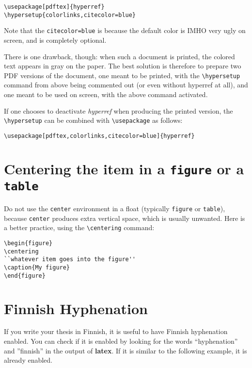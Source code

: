 \documentclass[a4paper,12pt]{article}
\newcommand{\cmd}[1]{\texttt{\textbackslash#1}}
\newcommand{\env}[1]{\texttt{#1}}
\newcommand{\pack}[1]{\textit{#1}}
\newcommand{\prog}[1]{\textbf{\textsf{#1}}}
\begin{document}
\begin{verbatim}
\usepackage[pdftex]{hyperref}
\hypersetup{colorlinks,citecolor=blue}
\end{verbatim}

Note that the \verb"citecolor=blue" is because the default color is IMHO very
ugly on screen, and is completely optional.

There is one drawback, though: when such a document is printed, the colored
text appears in gray on the paper. The best solution is therefore to prepare
two PDF versions of the document, one meant to be printed, with the
\cmd{hypersetup} command from above being commented out (or even without hyperref
at all), and one meant to be used on screen, with the above command activated.

If one chooses to deactivate \pack{hyperref} when producing the printed
version, the \cmd{hypersetup} can be combined with \cmd{usepackage} as
follows:

\begin{verbatim}
\usepackage[pdftex,colorlinks,citecolor=blue]{hyperref}
\end{verbatim}

\section{Centering the item in a \env{figure} or a \env{table}}

Do not use the \env{center} environment in a float (typically \env{figure} or
\env{table}), because \env{center} produces extra vertical space, which is
usually unwanted. Here is a better practice, using the \cmd{centering} command:

\begin{verbatim}
\begin{figure}
\centering
``whatever item goes into the figure''
\caption{My figure}
\end{figure}
\end{verbatim}

\section{Finnish Hyphenation}

If you write your thesis in Finnish, it is useful to have Finnish hyphenation
enabled. You can check if it is enabled by looking for the words
``hyphenation'' and ''finnish'' in the output of \prog{latex}. If it is
similar to the following example, it is already enabled.
\end{document}
